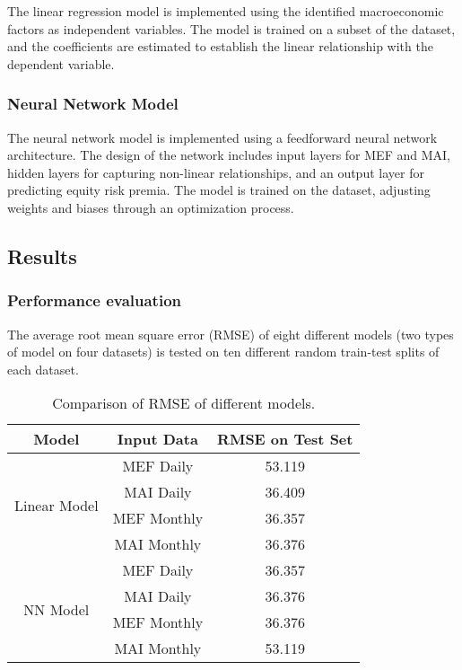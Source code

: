 \documentclass{article}
\begin{document}
The linear regression model is implemented using the identified macroeconomic factors as independent variables. The model is trained on a subset of the dataset, and the coefficients are estimated to establish the linear relationship with the dependent variable.

\subsubsection{Neural Network Model}

The neural network model is implemented using a feedforward neural network architecture. The design of the network includes input layers for MEF and MAI, hidden layers for capturing non-linear relationships, and an output layer for predicting equity risk premia. The model is trained on the dataset, adjusting weights and biases through an optimization process.

\subsection{Results}

\subsubsection{Performance evaluation}

The average root mean square error (RMSE) of eight different models (two types of model on four datasets) is tested on ten different random train-test splits of each dataset.

\begin{table}[H]
\centering
\begin{tabular}{|c|c|c|}
\hline
\textbf{Model} & \textbf{Input Data} & \textbf{RMSE on Test Set} \\ \hline
\multirow{4}{*}{Linear Model} & MEF Daily & 53.119 \\ \cline{2-3} 
 & MAI Daily & 36.409 \\ \cline{2-3} 
 & MEF Monthly & 36.357 \\ \cline{2-3} 
 & MAI Monthly & 36.376 \\ \hline
\multirow{4}{*}{NN Model} & MEF Daily & 36.357 \\ \cline{2-3} 
 & MAI Daily & 36.376 \\ \cline{2-3} 
 & MEF Monthly & 36.376 \\ \cline{2-3} 
 & MAI Monthly & 53.119 \\ \hline
\end{tabular}
\caption{Comparison of RMSE of different models.}
\label{tab:RMSE}
\end{table}
\end{document}
